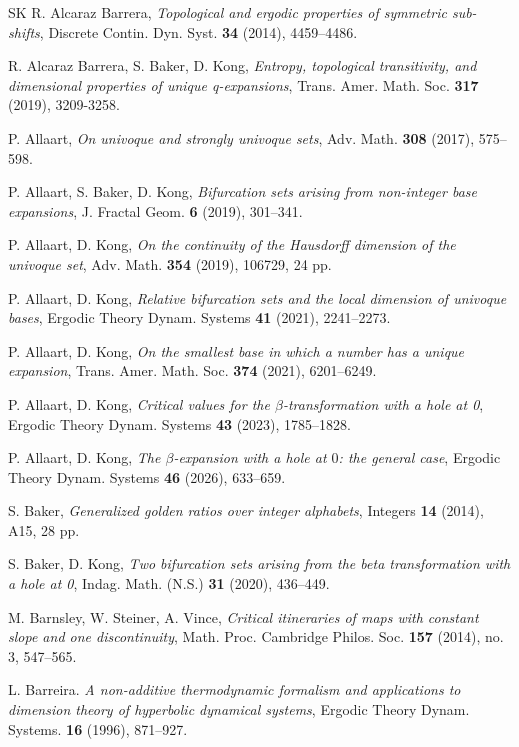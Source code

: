 \documentclass{amsart}
\theoremstyle{definition}
\numberwithin{equation}{section}
\begin{document}
\color{black}
\begin{thebibliography}{SK}
R. Alcaraz Barrera,
\emph{Topological and ergodic properties of symmetric sub-shifts}, Discrete Contin. Dyn. Syst. {\bf 34} (2014), 4459--4486.

R. Alcaraz Barrera, S. Baker, D. Kong,
\emph{Entropy, topological transitivity, and dimensional properties of unique q-expansions},
Trans. Amer. Math. Soc. {\bf 317} (2019), 3209-3258.

P. Allaart,
\emph{On univoque and strongly univoque sets},
Adv. Math. {\bf 308} (2017), 575--598.

P. Allaart, S. Baker, D. Kong,
\emph{Bifurcation sets arising from non-integer base expansions},
J. Fractal Geom.  {\bf 6} (2019), 301--341.

P. Allaart, D. Kong,
\emph{On the continuity of the Hausdorff dimension of the univoque set},
Adv. Math. {\bf 354} (2019), 106729, 24 pp.

P. Allaart,  D. Kong,
\emph{Relative bifurcation sets and the local dimension of univoque bases},
Ergodic Theory Dynam. Systems {\bf 41} (2021), 2241--2273.

P. Allaart, D. Kong,
\emph{On the smallest base in which a number has a unique expansion},
Trans. Amer. Math. Soc. {\bf 374} (2021), 6201--6249.

P. Allaart, D. Kong,
\emph{Critical values for the $\beta$-transformation with a hole at 0},
Ergodic Theory Dynam. Systems {\bf 43} (2023), 1785--1828.

P. Allaart, D. Kong,
\emph{The $\beta$-expansion with a hole at $0$: the general case}, Ergodic Theory Dynam. Systems {\bf 46} (2026), 633--659.

S. Baker,
\emph{Generalized golden ratios over integer alphabets},
Integers {\bf 14} (2014), A15, 28 pp.

S. Baker, D. Kong,
\emph{Two bifurcation sets arising from the beta transformation with a hole at 0}, Indag. Math. (N.S.) {\bf 31} (2020), 436--449.

M. Barnsley, W. Steiner, A. Vince, 
\emph{Critical itineraries of maps with constant slope and one discontinuity},
Math. Proc. Cambridge Philos. Soc. {\bf 157} (2014), no. 3, 547–565. 

L. Barreira.
\emph{A non-additive thermodynamic formalism and applications to dimension theory of hyperbolic dynamical systems},
Ergodic Theory Dynam. Systems. {\bf 16} (1996), 871--927.


\end{thebibliography}
\end{document}
